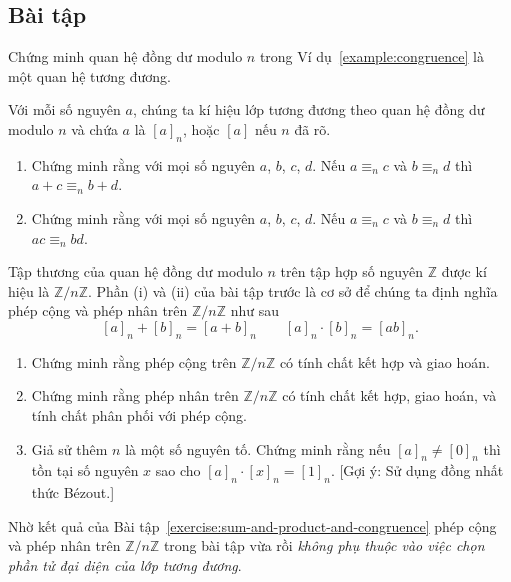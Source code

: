 \subsection{Bài tập}

\begin{exercise}
    Chứng minh quan hệ đồng dư modulo $n$ trong Ví dụ~\ref{example:congruence} là một quan hệ tương đương.
\end{exercise}

\begin{exercise}\label{exercise:sum-and-product-and-congruence}
    Với mỗi số nguyên $a$, chúng ta kí hiệu lớp tương đương theo quan hệ đồng dư modulo $n$ và chứa $a$ là ${[a]}_{n}$, hoặc $[a]$ nếu $n$ đã rõ.
    \begin{enumerate}[label={(\roman*)}]
        \item Chứng minh rằng với mọi số nguyên $a$, $b$, $c$, $d$. Nếu $a\equiv_{n} c$ và $b\equiv_{n} d$ thì $a + c \equiv_{n} b + d$.
        \item Chứng minh rằng với mọi số nguyên $a$, $b$, $c$, $d$. Nếu $a\equiv_{n} c$ và $b\equiv_{n} d$ thì $ac \equiv_{n} bd$.
    \end{enumerate}
\end{exercise}

\begin{exercise}
    Tập thương của quan hệ đồng dư modulo $n$ trên tập hợp số nguyên $\mathbb{Z}$ được kí hiệu là $\mathbb{Z}/n\mathbb{Z}$. Phần (i) và (ii) của bài tập trước là cơ sở để chúng ta định nghĩa phép cộng và phép nhân trên $\mathbb{Z}/n\mathbb{Z}$ như sau
    \[
        {[a]}_{n} + {[b]}_{n} = {[a+b]}_{n}\qquad {[a]}_{n}\cdot {[b]}_{n} = {[ab]}_{n}.    
    \]
    \begin{enumerate}[label={(\roman*)}]
        \item Chứng minh rằng phép cộng trên $\mathbb{Z}/n\mathbb{Z}$ có tính chất kết hợp và giao hoán.
        \item Chứng minh rằng phép nhân trên $\mathbb{Z}/n\mathbb{Z}$ có tính chất kết hợp, giao hoán, và tính chất phân phối với phép cộng.
        \item Giả sử thêm $n$ là một số nguyên tố. Chứng minh rằng nếu ${[a]}_{n}\ne {[0]}_{n}$ thì tồn tại số nguyên $x$ sao cho ${[a]}_{n}\cdot {[x]}_{n} = {[1]}_{n}$. [Gợi ý: Sử dụng đồng nhất thức B\'{e}zout.]
    \end{enumerate}
\end{exercise}

Nhờ kết quả của Bài tập~\ref{exercise:sum-and-product-and-congruence} phép cộng và phép nhân trên $\mathbb{Z}/n\mathbb{Z}$ trong bài tập vừa rồi \textit{không phụ thuộc vào việc chọn phần tử đại diện của lớp tương đương}.

